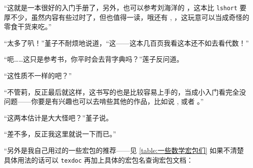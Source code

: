 “这就是一本很好的入门手册了，另外，也可以参考刘海洋的 \textcite[\LaTeX 入门]{刘海洋2013latex}，这本比 \verb"lshort" 要厚不少，虽然内容有些过时了，但也值得一读，哦还有 \textcite[\LaTeX{} Reference Sheet for a thesis with KOMA-Script]{RSTL23KS}, \textcite[现代 \LaTeX 入门讲座]{stonezeng}，这玩意可以当成奇怪的零食干货来吃。”

“太多了叭！”堇子不耐烦地说道，“这——这本几百页我看这本还不如去看代数！”

“呃……这只是参考书，你平时会去背字典吗？”莲子反问道。

“这性质不一样的吧？”

“不管莉，反正最后就这样，这书写的也是比较容易上手的，当成小入门看完全没问题——你要是有兴趣也可以去啃些其他的作品，比如说 \textcite[The \LaTeX{} Companion. Second Edition]{mittelbach2004latex}, 或者 \textcite[The \TeX book]{knuth1984texbook}。”

“这两本估计是大大怪吧？”堇子说。

“差不多，反正我这里就说一下而已。”

“另外是我自己用过的一些宏包的推荐——见 \autoref{table:一些数学宏包们} 如果不清楚具体用法的话可以 \verb"texdoc" 再加上具体的宏包名查询宏包文档：

